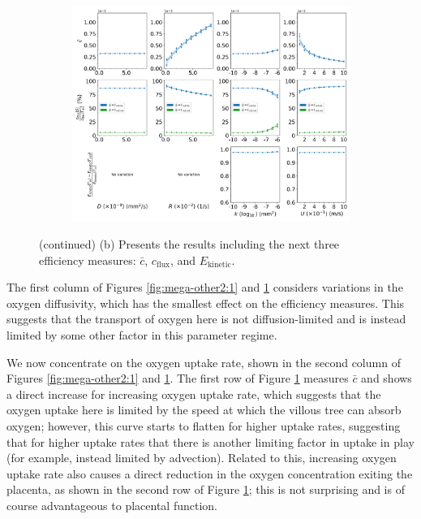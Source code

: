             \begin{figure}\ContinuedFloat
                \hspace{-1.9cm}
                \centering
                \begin{subfigure}{\textwidth}
                    \includegraphics[width=1.1\textwidth]{diagrams/results-variations/mega2_oxygen_diffusivity_oxygen_uptake_permeability_inlet_velocity.png}
                    \caption{}
                    \label{fig:mega-other2:2}
                \end{subfigure}
                \caption{(continued) (b) Presents the results including the next three efficiency measures: $\bar{c}$, $c_\text{flux}$, and $E_\text{kinetic}$.}
                \label{fig:mega-other2}
            \end{figure}

            The first column of Figures \ref{fig:mega-other2:1} and \ref{fig:mega-other2:2} considers variations in the oxygen diffusivity, which has the smallest effect on the efficiency measures. This suggests that the transport of oxygen here is not diffusion-limited and is instead limited by some other factor in this parameter regime.
            
            We now concentrate on the oxygen uptake rate, shown in the second column of Figures \ref{fig:mega-other2:1} and \ref{fig:mega-other2:2}. The first row of Figure \ref{fig:mega-other2:2} measures $\bar{c}$ and shows a direct increase for increasing oxygen uptake rate, which suggests that the oxygen uptake here is limited by the speed at which the villous tree can absorb oxygen; however, this curve starts to flatten for higher uptake rates, suggesting that for higher uptake rates that there is another limiting factor in uptake in play (for example, instead limited by advection). Related to this, increasing oxygen uptake rate also causes a direct reduction in the oxygen concentration exiting the placenta, as shown in the second row of Figure \ref{fig:mega-other2:2}; this is not surprising and is of course advantageous to placental function.

